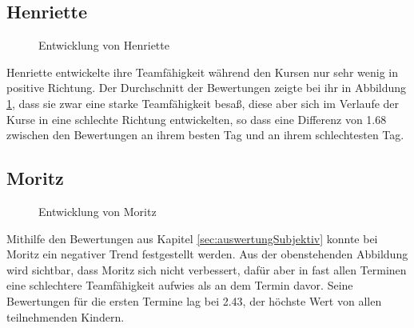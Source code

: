 \subsection{Henriette}
\begin{figure}[H]
	\centering
	\label{img:henrietteDevelopment}
	\caption{Entwicklung von Henriette}
\end{figure}
Henriette entwickelte ihre Teamfähigkeit während den Kursen nur sehr wenig in positive Richtung. Der Durchschnitt der Bewertungen zeigte bei ihr in Abbildung \ref{img:henrietteDevelopment}, dass sie zwar eine starke Teamfähigkeit besaß, diese aber sich im Verlaufe der Kurse in eine schlechte Richtung entwickelten, so dass eine Differenz von 1.68 zwischen den Bewertungen an ihrem besten Tag und an ihrem schlechtesten Tag.


\subsection{Moritz}
\begin{figure}[H]
	\centering
	\label{img:moritzDevelopment}
	\caption{Entwicklung von Moritz}
\end{figure}
Mithilfe den Bewertungen aus Kapitel \ref{sec:auswertungSubjektiv} konnte bei Moritz ein negativer Trend festgestellt werden. Aus der obenstehenden Abbildung wird sichtbar, dass Moritz sich nicht verbessert, dafür aber in fast allen Terminen eine schlechtere Teamfähigkeit aufwies als an dem Termin davor. Seine Bewertungen für die ersten Termine lag bei 2.43, der höchste Wert von allen teilnehmenden Kindern.



